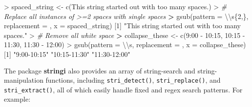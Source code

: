 \documentclass[
]{book}
\newenvironment{Shaded}{\begin{snugshade}}{\end{snugshade}}
\newcommand{\AttributeTok}[1]{\textcolor[rgb]{0.77,0.63,0.00}{#1}}
\newcommand{\CommentTok}[1]{\textcolor[rgb]{0.56,0.35,0.01}{\textit{#1}}}
\newcommand{\DecValTok}[1]{\textcolor[rgb]{0.00,0.00,0.81}{#1}}
\newcommand{\ErrorTok}[1]{\textcolor[rgb]{0.64,0.00,0.00}{\textbf{#1}}}
\newcommand{\FunctionTok}[1]{\textcolor[rgb]{0.00,0.00,0.00}{#1}}
\newcommand{\NormalTok}[1]{#1}
\newcommand{\OtherTok}[1]{\textcolor[rgb]{0.56,0.35,0.01}{#1}}
\newcommand{\SpecialCharTok}[1]{\textcolor[rgb]{0.00,0.00,0.00}{#1}}
\newcommand{\StringTok}[1]{\textcolor[rgb]{0.31,0.60,0.02}{#1}}
\begin{document}
\begin{Shaded}
\begin{Highlighting}[]
\SpecialCharTok{\textgreater{}}\NormalTok{ spaced\_string }\OtherTok{\textless{}{-}} \FunctionTok{c}\NormalTok{(}\StringTok{\textquotesingle{}This      string    started  out with too    many    spaces.\textquotesingle{}}\NormalTok{)}
\SpecialCharTok{\textgreater{}} \CommentTok{\# Replace all instances of \textgreater{}=2 spaces with single spaces}
\ErrorTok{\textgreater{}} \FunctionTok{gsub}\NormalTok{(}\AttributeTok{pattern =} \StringTok{\textquotesingle{}}\SpecialCharTok{\textbackslash{}\textbackslash{}}\StringTok{s\{2,\}\textquotesingle{}}\NormalTok{, }\AttributeTok{replacement =} \StringTok{\textquotesingle{} \textquotesingle{}}\NormalTok{, }\AttributeTok{x =}\NormalTok{ spaced\_string)}
\NormalTok{[}\DecValTok{1}\NormalTok{] }\StringTok{"This string started out with too many spaces."}
\SpecialCharTok{\textgreater{}} \CommentTok{\# Remove all white space}
\ErrorTok{\textgreater{}}\NormalTok{ collapse\_these }\OtherTok{\textless{}{-}} \FunctionTok{c}\NormalTok{(}\StringTok{\textquotesingle{}9:00 {-} 10:15\textquotesingle{}}\NormalTok{, }\StringTok{\textquotesingle{}10:15 {-} 11:30\textquotesingle{}}\NormalTok{, }\StringTok{\textquotesingle{}11:30 {-} 12:00\textquotesingle{}}\NormalTok{)}
\SpecialCharTok{\textgreater{}} \FunctionTok{gsub}\NormalTok{(}\AttributeTok{pattern =} \StringTok{\textquotesingle{}}\SpecialCharTok{\textbackslash{}\textbackslash{}}\StringTok{s\textquotesingle{}}\NormalTok{, }\AttributeTok{replacement =} \StringTok{\textquotesingle{}\textquotesingle{}}\NormalTok{, }\AttributeTok{x =}\NormalTok{ collapse\_these)}
\NormalTok{[}\DecValTok{1}\NormalTok{] }\StringTok{"9:00{-}10:15"}  \StringTok{"10:15{-}11:30"} \StringTok{"11:30{-}12:00"}
\end{Highlighting}
\end{Shaded}

The package \textbf{stringi} also provides an array of string-search and string-manipulation functions, including \texttt{stri\_detect()}, \texttt{stri\_replace()}, and \texttt{stri\_extract()}, all of which easily handle fixed and regex search patterns. For example:
\end{document}
